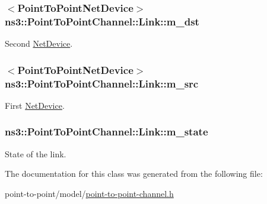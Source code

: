 \subsubsection[{\texorpdfstring{m\+\_\+dst}{m_dst}}]{$<${\bf Point\+To\+Point\+Net\+Device}$>$ ns3\+::\+Point\+To\+Point\+Channel\+::\+Link\+::m\+\_\+dst}\hypertarget{classns3_1_1PointToPointChannel_1_1Link_a3451cdfb5789678875b195b459459274}{}\label{classns3_1_1PointToPointChannel_1_1Link_a3451cdfb5789678875b195b459459274}


Second \hyperlink{classns3_1_1NetDevice}{Net\+Device}. 

\subsubsection[{\texorpdfstring{m\+\_\+src}{m_src}}]{$<${\bf Point\+To\+Point\+Net\+Device}$>$ ns3\+::\+Point\+To\+Point\+Channel\+::\+Link\+::m\+\_\+src}\hypertarget{classns3_1_1PointToPointChannel_1_1Link_ac0a88e6470a4c34eddc66de5d294c938}{}\label{classns3_1_1PointToPointChannel_1_1Link_ac0a88e6470a4c34eddc66de5d294c938}


First \hyperlink{classns3_1_1NetDevice}{Net\+Device}. 

\subsubsection[{\texorpdfstring{m\+\_\+state}{m_state}}]{ ns3\+::\+Point\+To\+Point\+Channel\+::\+Link\+::m\+\_\+state}\hypertarget{classns3_1_1PointToPointChannel_1_1Link_afcd335f99bcc58b47e4790b5f1f85417}{}\label{classns3_1_1PointToPointChannel_1_1Link_afcd335f99bcc58b47e4790b5f1f85417}


State of the link. 



The documentation for this class was generated from the following file\+:\begin{DoxyCompactItemize}
\item 
point-\/to-\/point/model/\hyperlink{point-to-point-channel_8h}{point-\/to-\/point-\/channel.\+h}\end{DoxyCompactItemize}
